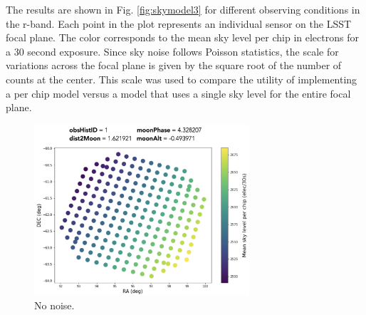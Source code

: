 The results are shown in Fig. \ref{fig:skymodel3} for different observing conditions in the r-band. Each point in the plot represents an individual sensor on the LSST focal plane. The color corresponds to the mean sky level per chip in electrons for a 30 second exposure. Since sky noise follows Poisson statistics, the scale for variations across the focal plane is given by the square root of the number of counts at the center. This scale was used to compare the utility of implementing a per chip model versus a model that uses a single sky level for the entire focal plane.

\begin{figure}
\centering
\label{fig:skymodel1}
\includegraphics[width=8cm]{images/sensors/skymodel1.jpg}
\caption{No noise.}
\end{figure}

